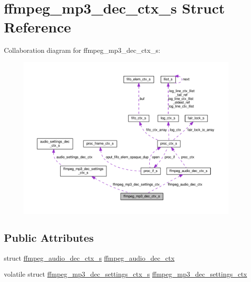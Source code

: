 \hypertarget{structffmpeg__mp3__dec__ctx__s}{}\section{ffmpeg\+\_\+mp3\+\_\+dec\+\_\+ctx\+\_\+s Struct Reference}
\label{structffmpeg__mp3__dec__ctx__s}


Collaboration diagram for ffmpeg\+\_\+mp3\+\_\+dec\+\_\+ctx\+\_\+s\+:\nopagebreak
\begin{figure}[H]
\begin{center}
\leavevmode
\includegraphics[width=350pt]{structffmpeg__mp3__dec__ctx__s__coll__graph}
\end{center}
\end{figure}
\subsection*{Public Attributes}
\begin{DoxyCompactItemize}
\item 
struct \hyperlink{structffmpeg__audio__dec__ctx__s}{ffmpeg\+\_\+audio\+\_\+dec\+\_\+ctx\+\_\+s} \hyperlink{structffmpeg__mp3__dec__ctx__s_a16bbe11f4a4b51208b0a2cb998a75bb7}{ffmpeg\+\_\+audio\+\_\+dec\+\_\+ctx}
\item 
volatile struct \hyperlink{structffmpeg__mp3__dec__settings__ctx__s}{ffmpeg\+\_\+mp3\+\_\+dec\+\_\+settings\+\_\+ctx\+\_\+s} \hyperlink{structffmpeg__mp3__dec__ctx__s_adcc96548bcf6aab1843b95c9c76e26a9}{ffmpeg\+\_\+mp3\+\_\+dec\+\_\+settings\+\_\+ctx}
\end{DoxyCompactItemize}


